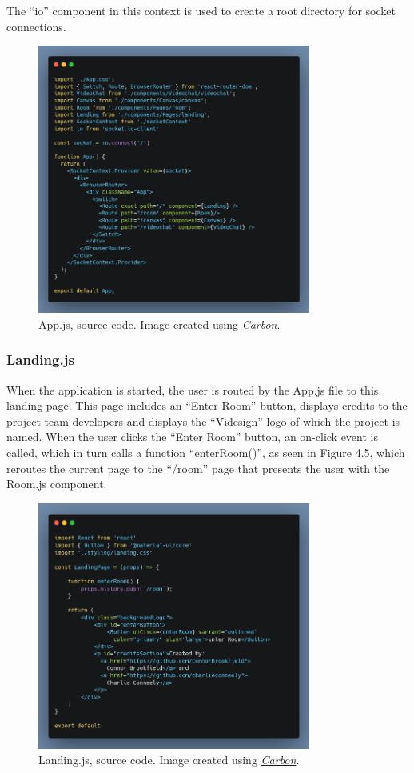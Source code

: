 The “io” component in this context is used to create a root directory for socket connections.
\begin{figure}[H]
    \centering
    \includegraphics[width=0.8\textwidth]{img/SystemDesign/appJs.png}
    \caption{App.js, source code. Image created using \href{https://carbon.now.sh/}{\textit{Carbon}}.}
\end{figure}

\subsubsection{Landing.js}
When the application is started, the user is routed by the App.js file to this landing page. This page includes an “Enter Room” button, displays credits to the project team developers and displays the “Videsign” logo of which the project is named. When the user clicks the “Enter Room” button, an on-click event is called, which in turn calls a function “enterRoom()”, as seen in Figure 4.5, which reroutes the current page to the “/room” page that presents the user with the Room.js component.
\begin{figure}[H]
    \centering
    \includegraphics[width=0.8\textwidth]{img/SystemDesign/landingPageJs.png}
    \caption{Landing.js, source code. Image created using \href{https://carbon.now.sh/}{\textit{Carbon}}.}
\end{figure}

